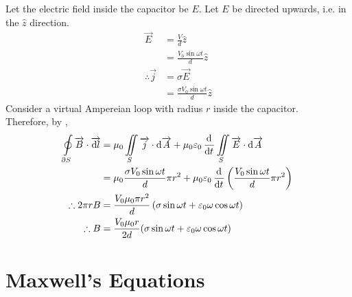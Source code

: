 \documentclass[fleqn, a4paper, 8pt, twoside]{amsart}
\theoremstyle{definition}
\theoremstyle{theorem}
\begin{document}
\begin{multicols}{2}
\begin{spacing}{0.6}
\begin{solution}
	Let the electric field inside the capacitor be $E$.
	Let $E$ be directed upwards, i.e. in the $\hat{z}$ direction.\\
	\begin{align*}
		\overrightarrow{E}            & = \frac{V}{d} \hat{z}                 \\
                                              & = \frac{V_0 \sin \omega t}{d} \hat{z} \\
		\therefore \overrightarrow{j} & = \sigma \overrightarrow{E}           \\
                                              & = \frac{\sigma V_0 \sin \omega t}{d} \hat{z}
	\end{align*}
	Consider a virtual Ampereian loop with radius $r$ inside the capacitor.\\
	Therefore, by ,
	\begin{align*}
		\oint\limits_{\partial S} \overrightarrow{B} \cdot \overrightarrow{\dif l} & = \mu_0 \iint\limits_{S} \overrightarrow{j} \cdot \dif \overrightarrow{A} + \mu_0 \varepsilon_0 \dod{}{t}\iint\limits_{S} \overrightarrow{E} \cdot \dif \overrightarrow{A} \\
                                                                                           & = \mu_0 \frac{\sigma V_0 \sin \omega t}{d} \pi r^2 + \mu_0 \varepsilon_0 \dod{}{t}\left( \frac{V_0 \sin \omega t}{d} \pi r^2 \right)                                       \\
		\therefore 2 \pi r B                                                       & = \frac{V_0 \mu_0 \pi r^2}{d} \left( \sigma \sin \omega t + \varepsilon_0 \omega \cos \omega t \right)                                                                     \\
		\therefore B                                                               & = \frac{V_0 \mu_0 r}{2 d} (\sigma \sin \omega t + \varepsilon_0 \omega \cos \omega t)
	\end{align*}
\end{solution}

\end{spacing}

\end{multicols}

\section{Maxwell's Equations}
\end{document}
